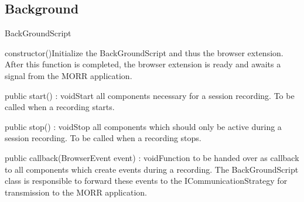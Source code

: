 \subsection{Background}
\begin{class}{BackGroundScript}




\begin{constructors}
\begin{constructor}{constructor()}{Initialize the BackGroundScript and thus the browser extension. After this function is completed, the browser extension is ready and awaits a signal from the MORR application.}
\end{constructor}
\end{constructors}
\begin{methods}
\begin{method}{public start() : void}{Start all components necessary for a session recording. To be called when a recording starts.}
\end{method}
\begin{method}{public stop() : void}{Stop all components which should only be active during a session recording. To be called when a recording stops.}
\end{method}
\begin{method}{public callback(BrowserEvent event) : void}{Function to be handed over as callback to all components which create events during a recording. The BackGroundScript class is responsible to forward these events to the ICommunicationStrategy for transmission to the MORR application.}
\begin{parameters}
\end{parameters}
\end{method}
\end{methods}
\end{class}

